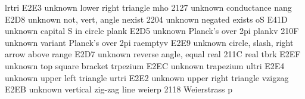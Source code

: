  lrtri          E2E3 {unknown} lower right triangle
 mho            2127 {unknown} conductance
 nang           E2D8 {unknown} not, vert, angle
 nexist         2204 {unknown} negated exists
 oS             E41D {unknown} capital S in circle
 plank          E2D5 {unknown} Planck's over 2pi
 plankv         210F {unknown} variant Planck's over 2pi
 raemptyv       E2E9 {unknown} circle, slash, right arrow above
 range          E2D7 {unknown} reverse angle, equal
 real           211C {\Re} real
 tbrk           E2EF {unknown} top square bracket
 trpezium       E2EC {unknown} trapezium
 ultri          E2E4 {unknown} upper left triangle
 urtri          E2E2 {unknown} upper right triangle
 vzigzag        E2EB {unknown} vertical zig-zag line
 weierp         2118 {\wp} Weierstrass p
